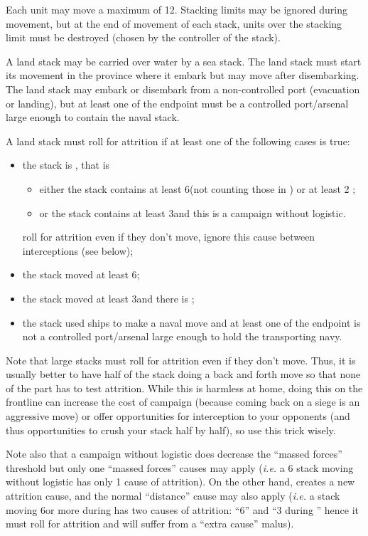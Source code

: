 Each unit may move a maximum of 12\MP. Stacking limits may be ignored during
movement, but at the end of movement of each stack, units over the stacking
limit must be destroyed (chosen by the controller of the stack).

A land stack may be carried over water by a sea stack. The land stack must
start its movement in the province where it embark but may move after
disembarking. The land stack may embark or disembark from a non-controlled
port (evacuation or landing), but at least one of the endpoint must be a
controlled port/arsenal large enough to contain the naval stack.

A land stack must roll for attrition if at least one of the following cases is
true:
\begin{itemize}
\item the stack is , that is
  \begin{itemize}
  \item either the stack contains at least 6\LD (not counting those in \Pasha)
    or at least 2 \Pashas;
  \item or the stack contains at least 3\LD and this is a campaign without
    logistic.
  \end{itemize}
   roll for attrition even if they don't move, ignore
  this cause between interceptions (see below);
\item the stack moved at least 6\MP;
\item the stack moved at least 3\MP and there is ;
\item the stack used ships to make a naval move and at least one of the
  endpoint is not a controlled port/arsenal large enough to hold the
  transporting navy.
\end{itemize}

Note that large stacks must roll for attrition even if they don't move. Thus,
it is usually better to have half of the stack doing a back and forth move so
that none of the part has to test attrition. While this is harmless at home,
doing this on the frontline can increase the cost of campaign (because coming
back on a siege is an aggressive move) or offer opportunities for interception
to your opponents (and thus opportunities to crush your stack half by half),
so use this trick wisely.

Note also that a campaign without logistic does decrease the ``massed forces''
threshold but only one ``massed forces'' causes may apply (\emph{i.e.} a 6\LD
stack moving without logistic has only 1 cause of attrition). On the other
hand,  creates a new attrition cause, and the normal
``distance'' cause may also apply (\emph{i.e.} a stack moving 6\MP or more
during  has two causes of attrition: ``6\MP'' and ``3\MP
during '' hence it must roll for attrition and will suffer
from a ``extra cause'' malus).

